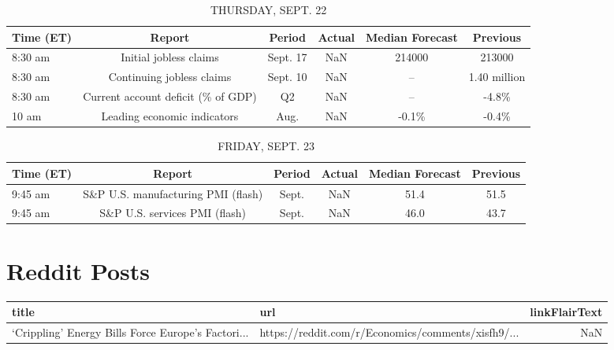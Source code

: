 \documentclass{article}%
\begin{document}
%


\begin{table}[htbp]%
\caption{THURSDAY, SEPT. 22}%
\centering%
\begin{adjustbox}{width=1\textwidth}%
\begin{tabular}{lccccc}
\toprule
Time (ET) &                             Report &   Period & Actual & Median Forecast &     Previous \\
\midrule
  8:30 am &             Initial jobless claims & Sept. 17 &    NaN &          214000 &       213000 \\
  8:30 am &          Continuing jobless claims & Sept. 10 &    NaN &              -- & 1.40 million \\
  8:30 am & Current account deficit (\% of GDP) &       Q2 &    NaN &              -- &        -4.8\% \\
    10 am &        Leading economic indicators &     Aug. &    NaN &           -0.1\% &        -0.4\% \\
\bottomrule
\end{tabular}
%
\end{adjustbox}%
\end{table}

%


\begin{table}[htbp]%
\caption{FRIDAY, SEPT. 23}%
\centering%
\begin{adjustbox}{width=1\textwidth}%
\begin{tabular}{lccccc}
\toprule
Time (ET) &                             Report & Period & Actual & Median Forecast & Previous \\
\midrule
  9:45 am & S\&P U.S. manufacturing PMI (flash) &  Sept. &    NaN &            51.4 &     51.5 \\
  9:45 am &      S\&P U.S. services PMI (flash) &  Sept. &    NaN &            46.0 &     43.7 \\
\bottomrule
\end{tabular}
%
\end{adjustbox}%
\end{table}

%
\section{Reddit Posts}%
\label{sec:RedditPosts}%


\begin{table}[htbp]%
\centering%
\begin{adjustbox}{width=1\textwidth}%
\begin{tabular}{llr}
\toprule
                                             title &                                                url &  linkFlairText \\
\midrule
‘Crippling’ Energy Bills Force Europe’s Factori... & https://reddit.com/r/Economics/comments/xisfh9/... &            NaN \\
\bottomrule
\end{tabular}
%
\end{adjustbox}%
\end{table}

%
\end{document}
